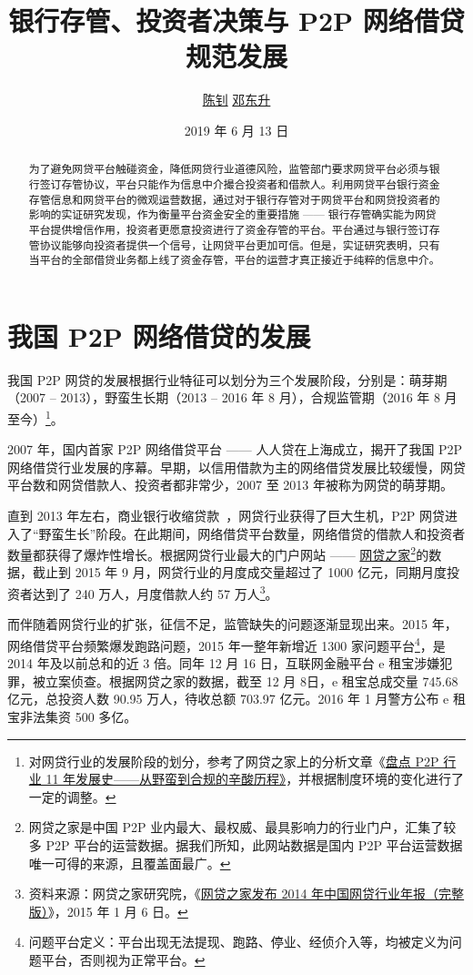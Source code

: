 \documentclass[lang=cn,11pt]{elegantpaper}
\title{银行存管、投资者决策与 P2P 网络借贷规范发展}
\author{\href{http://www.cces.fudan.edu.cn/researchdetail.aspx?id=6}{陈钊} \quad \href{https://ddswhu.me/}{邓东升}}
\institute{复旦大学 \; 经济学院\\ 中国社会主义市场经济研究中心}
\date{2019 年 6 月 13 日}
\begin{document}
\maketitle

\begin{abstract}
为了避免网贷平台触碰资金，降低网贷行业道德风险，监管部门要求网贷平台必须与银行签订存管协议，平台只能作为信息中介撮合投资者和借款人。利用网贷平台银行资金存管信息和网贷平台的微观运营数据，通过对于银行存管对于网贷平台和网贷投资者的影响的实证研究发现，作为衡量平台资金安全的重要措施 —— 银行存管确实能为网贷平台提供增信作用，投资者更愿意投资进行了资金存管的平台。平台通过与银行签订存管协议能够向投资者提供一个信号，让网贷平台更加可信。但是，实证研究表明，只有当平台的全部借贷业务都上线了资金存管，平台的运营才真正接近于纯粹的信息中介。
\end{abstract}

\section{我国 P2P 网络借贷的发展}
我国 P2P 网贷的发展根据行业特征可以划分为三个发展阶段，分别是：萌芽期（2007 -- 2013），野蛮生长期（2013 -- 2016 年 8 月），合规监管期（2016 年 8 月至今）\footnote{对网贷行业的发展阶段的划分，参考了网贷之家上的分析文章《\href{https://www.wdzj.com/zhuanlan/guancha/17-10089-1.html}{盘点 P2P 行业 11 年发展史——从野蛮到合规的辛酸历程》}，并根据制度环境的变化进行了一定的调整。}。

2007 年，国内首家 P2P 网络借贷平台 —— 人人贷在上海成立，揭开了我国 P2P 网络借贷行业发展的序幕。早期，以信用借款为主的网络借贷发展比较缓慢，网贷平台数和网贷借款人、投资者都非常少，2007 至 2013 年被称为网贷的萌芽期。

直到 2013 年左右，商业银行收缩贷款~\citep{pmm2014}，网贷行业获得了巨大生机，P2P 网贷进入了“野蛮生长”阶段。在此期间，网络借贷平台数量，网络借贷的借款人和投资者数量都获得了爆炸性增长。根据网贷行业最大的门户网站 —— \href{https://www.wdzj.com/}{网贷之家}\footnote{网贷之家是中国 P2P 业内最大、最权威、最具影响力的行业门户，汇集了较多 P2P 平台的运营数据。据我们所知，此网站数据是国内 P2P 平台运营数据唯一可得的来源，且覆盖面最广。}的数据，截止到 2015 年 9 月，网贷行业的月度成交量超过了 1000 亿元，同期月度投资者达到了 240 万人，月度借款人约 57 万人\footnote{资料来源：网贷之家研究院，《\href{https://www.wdzj.com/news/baogao/16305.html}{网贷之家发布 2014 年中国网贷行业年报（完整版）}》，2015 年 1 月 6 日。}。

而伴随着网贷行业的扩张，征信不足，监管缺失的问题逐渐显现出来。2015 年，网络借贷平台频繁爆发跑路问题，2015 年一整年新增近 1300 家问题平台\footnote{问题平台定义：平台出现无法提现、跑路、停业、经侦介入等，均被定义为问题平台，否则视为正常平台。}，是 2014 年及以前总和的近 3 倍。同年 12 月 16 日，互联网金融平台 e 租宝涉嫌犯罪，被立案侦查。根据网贷之家的数据，截至 12 月 8日，e 租宝总成交量 745.68 亿元，总投资人数 90.95 万人，待收总额 703.97 亿元。2016 年 1 月警方公布 e 租宝非法集资 500 多亿。
\end{document}
